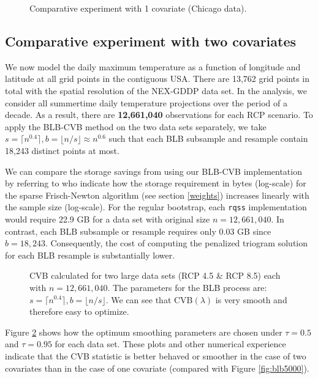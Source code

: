 \documentclass{statsoc}
\begin{document}
\begin{figure}[H]
\centering   
  
\caption{Comparative experiment with 1 covariate (Chicago data).}
\label{fig:onedim_chicago}
\end{figure}

\subsection{Comparative experiment with two covariates}\label{USA}

We now model the daily maximum temperature as a function of longitude and latitude at all grid points in the contiguous USA. There are 13,762 grid points in total with the spatial resolution of the NEX-GDDP data set. In the analysis, we consider all summertime daily temperature projections over the period of a decade. As a result, there are {\bf 12,661,040} observations for each RCP scenario. To apply the BLB-CVB method on the two data sets separately, we take $s=\lceil n^{0.4}\rceil, b=\lfloor n/s \rfloor\approx n^{0.6}$ such that each BLB subsample and resample contain 18,243 distinct points at most. 

We can compare the storage savings from using our BLB-CVB implementation by referring to \citet{koenker2005frisch} who indicate how the storage requirement in bytes (log-scale) for the sparse Frisch-Newton algorithm (see section \ref{weights}) increases linearly with the sample size (log-scale). For the regular bootstrap, each \texttt{rqss} implementation would require 22.9 GB for a data set with original size $n=12,661,040$. In contrast, each BLB subsample or resample requires only 0.03 GB since $b=18,243$. Consequently, the cost of computing the penalized triogram solution for each BLB resample is substantially lower.

\begin{figure}
\centering   
  
\caption{CVB calculated for two large data sets (RCP 4.5 \& RCP 8.5) each with $n=12,661,040$. The parameters for the BLB process are: $s=\lceil n^{0.4}\rceil,b=\lfloor n/s\rfloor$. We can see that  CVB$(\lambda)$ is very smooth and therefore easy to optimize.}
\label{fig:MCV}
\end{figure}
Figure \ref{fig:MCV} shows how the optimum smoothing parameters are chosen under $\tau=0.5$ and $\tau=0.95$ for each data set. These plots and other numerical experience indicate that the CVB statistic is better behaved or smoother in the case of two covariates than in the case of one covariate  {(compared with Figure \ref{fig:blb5000})}. 
\end{document}
